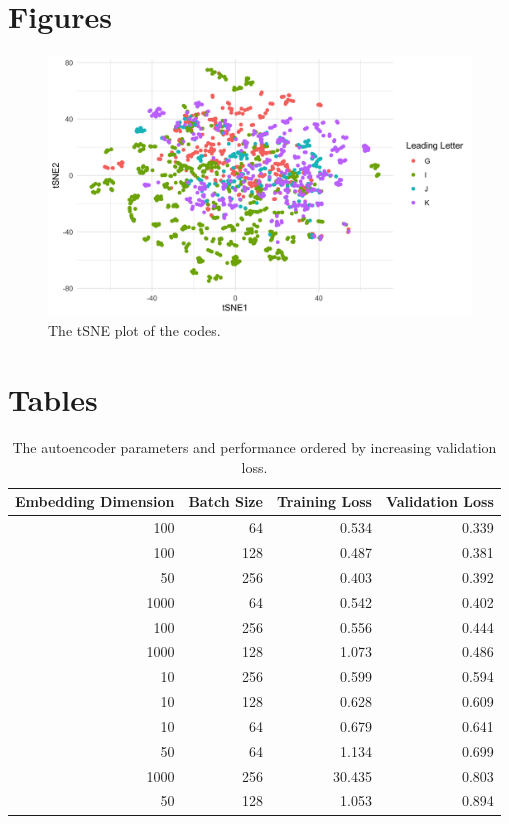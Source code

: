 \documentclass{bmcart}
\begin{document}
\begin{backmatter}

\pagebreak

\section*{Figures}

\begin{figure}[ht!]
  \includegraphics[width=\linewidth]{tsne-plot.png}
  \caption{The tSNE plot of the codes.}
  \label{fig:tsne}
\end{figure}


\pagebreak
\section*{Tables}

\begin{table}[ht!]
\caption{The autoencoder parameters and performance ordered by increasing validation loss.}
\label{tab:autoencoder_perf}
\begin{tabular}{|r|r|r|r|}
\hline
Embedding Dimension & Batch Size & Training Loss & Validation Loss\\
\hline
100 & 64 & 0.534 & 0.339\\
\hline
100 & 128 & 0.487 & 0.381\\
\hline
50 & 256 & 0.403 & 0.392\\
\hline
1000 & 64 & 0.542 & 0.402\\
\hline
100 & 256 & 0.556 & 0.444\\
\hline
1000 & 128 & 1.073 & 0.486\\
\hline
10 & 256 & 0.599 & 0.594\\
\hline
10 & 128 & 0.628 & 0.609\\
\hline
10 & 64 & 0.679 & 0.641\\
\hline
50 & 64 & 1.134 & 0.699\\
\hline
1000 & 256 & 30.435 & 0.803\\
\hline
50 & 128 & 1.053 & 0.894\\


\end{tabular}
\end{table}
\end{backmatter}
\end{document}
